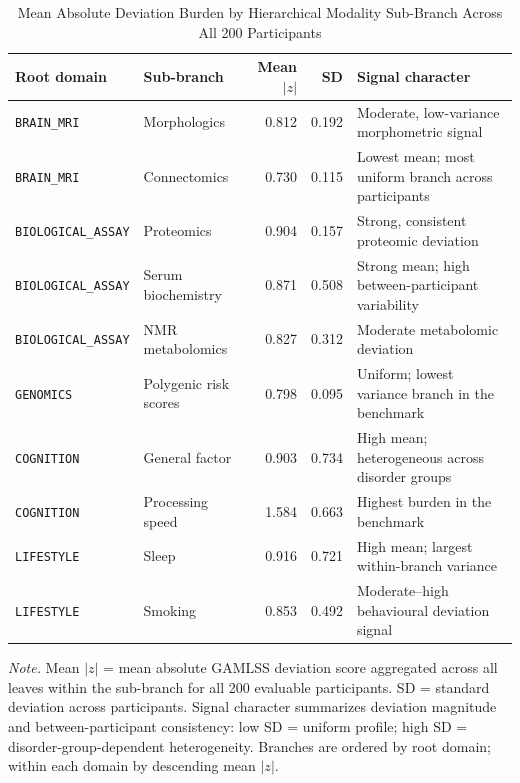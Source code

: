 \documentclass[11pt,a4paper,twoside]{article}
\begin{document}
\begin{table}[H]
\caption{Mean Absolute Deviation Burden by Hierarchical Modality Sub-Branch Across All 200 Participants}
\label{tab:s9}
\footnotesize
\begin{tabularx}{\linewidth}{l l r r X}
\toprule
Root domain & Sub-branch & Mean $|z|$ & SD & Signal character \\
\midrule
\texttt{BRAIN\_MRI} & Morphologics & 0.812 & 0.192 & Moderate, low-variance morphometric signal \\
\texttt{BRAIN\_MRI} & Connectomics & 0.730 & 0.115 & Lowest mean; most uniform branch across participants \\
\texttt{BIOLOGICAL\_ASSAY} & Proteomics & 0.904 & 0.157 & Strong, consistent proteomic deviation \\
\texttt{BIOLOGICAL\_ASSAY} & Serum biochemistry & 0.871 & 0.508 & Strong mean; high between-participant variability \\
\texttt{BIOLOGICAL\_ASSAY} & NMR metabolomics & 0.827 & 0.312 & Moderate metabolomic deviation \\
\texttt{GENOMICS} & Polygenic risk scores & 0.798 & 0.095 & Uniform; lowest variance branch in the benchmark \\
\texttt{COGNITION} & General factor & 0.903 & 0.734 & High mean; heterogeneous across disorder groups \\
\texttt{COGNITION} & Processing speed & 1.584 & 0.663 & Highest burden in the benchmark \\
\texttt{LIFESTYLE} & Sleep & 0.916 & 0.721 & High mean; largest within-branch variance \\
\texttt{LIFESTYLE} & Smoking & 0.853 & 0.492 & Moderate--high behavioural deviation signal \\
\bottomrule
\end{tabularx}
\par\smallskip\noindent\small\textit{Note.} Mean $|z|$ = mean absolute GAMLSS deviation score aggregated across all leaves within the sub-branch for all 200 evaluable participants. SD = standard deviation across participants. Signal character summarizes deviation magnitude and between-participant consistency: low SD = uniform profile; high SD = disorder-group-dependent heterogeneity. Branches are ordered by root domain; within each domain by descending mean $|z|$.
\end{table}
\end{document}
